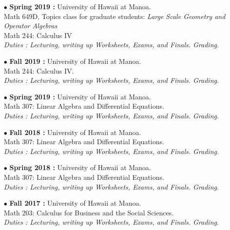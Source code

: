 \documentclass[a4paper]{article}
\begin{document}
\begin{itemize}
\item[$\bullet$] \textbf{ Spring 2019 :} University of Hawaii at Manoa.\\
					Math 649D, Topics class for graduate students: \textit{Large Scale Geometry and Operator Algebras}\\
					Math 244: Calculus IV\\
					\textit{Duties : Lecturing, writing up Worksheets, Exams, and Finals. Grading.}\\
\item[$\bullet$] \textbf{ Fall 2019 :} University of Hawaii at Manoa.\\
					Math 244: Calculus IV.\\
					\textit{Duties : Lecturing, writing up Worksheets, Exams, and Finals. Grading.}\\

\item[$\bullet$] \textbf{ Spring 2019 :} University of Hawaii at Manoa.\\
					Math 307: Linear Algebra and Differential Equations.\\
					\textit{Duties : Lecturing, writing up Worksheets, Exams, and Finals. Grading.}\\

\item[$\bullet$] \textbf{ Fall 2018 :} University of Hawaii at Manoa.\\
					Math 307: Linear Algebra and Differential Equations.\\
					\textit{Duties : Lecturing, writing up Worksheets, Exams, and Finals. Grading.}\\

\item[$\bullet$] \textbf{ Spring 2018 :} University of Hawaii at Manoa.\\
					 Math 307: Linear Algebra and Differential Equations.\\
					\textit{Duties : Lecturing, writing up Worksheets, Exams, and Finals. Grading.}\\

\item[$\bullet$] \textbf{ Fall 2017 :} University of Hawaii at Manoa.\\
				 	Math 203: Calculus for Business and the Social Sciences.\\
					\textit{Duties : Lecturing, writing up Worksheets, Exams, and Finals. Grading.}\\


\end{itemize}
\end{document}
